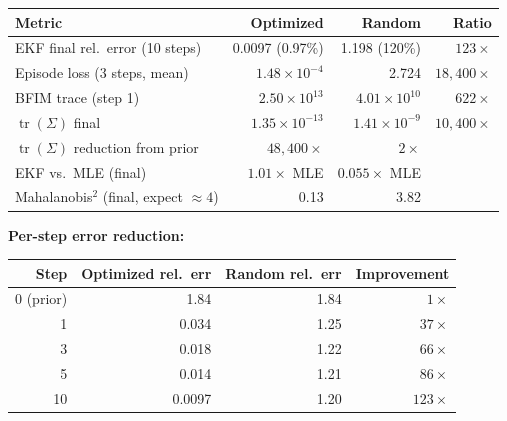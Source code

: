 \documentclass[11pt,a4paper]{article}
\newcommand{\tr}{\operatorname{tr}}
\begin{document}
\begin{center}
\begin{tabular}{@{}lrrr@{}}
\toprule
Metric & Optimized & Random & Ratio \\
\midrule
EKF final rel.\ error (10 steps) & 0.0097 (0.97\%) & 1.198 (120\%) & $123\times$ \\
Episode loss (3 steps, mean) & $1.48 \times 10^{-4}$ & 2.724 & $18{,}400\times$ \\
BFIM trace (step 1) & $2.50 \times 10^{13}$ & $4.01 \times 10^{10}$ & $622\times$ \\
$\tr(\Sigma)$ final & $1.35 \times 10^{-13}$ & $1.41 \times 10^{-9}$ & $10{,}400\times$ \\
$\tr(\Sigma)$ reduction from prior & $48{,}400\times$ & $2\times$ & \\
EKF vs.\ MLE (final) & $1.01\times$ MLE & $0.055\times$ MLE & \\
Mahalanobis$^2$ (final, expect $\approx 4$) & 0.13 & 3.82 & \\
\bottomrule
\end{tabular}
\end{center}

\textbf{Per-step error reduction:}

\begin{center}
\begin{tabular}{@{}rrrr@{}}
\toprule
Step & Optimized rel.\ err & Random rel.\ err & Improvement \\
\midrule
0 (prior) & 1.84 & 1.84 & $1\times$ \\
1 & 0.034 & 1.25 & $37\times$ \\
3 & 0.018 & 1.22 & $66\times$ \\
5 & 0.014 & 1.21 & $86\times$ \\
10 & 0.0097 & 1.20 & $123\times$ \\
\bottomrule
\end{tabular}
\end{center}
\end{document}
